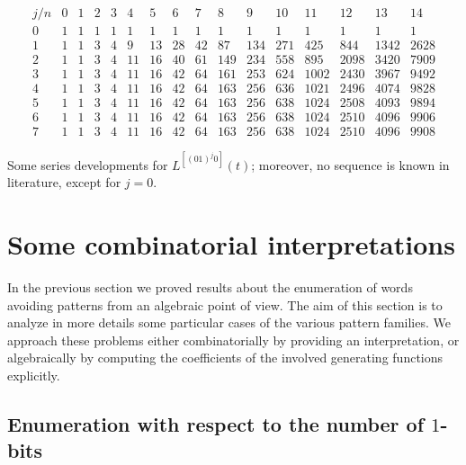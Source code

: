 \begin{table}
\begin{equation*}\begin{array}{c|ccccccccccccccc}j/n & 0 & 1 & 2 & 3 & 4 & 5 & 6 & 7 & 8 & 9 & 10 & 11 & 12 & 13 & 14\\\hline0 & 1 & 1 & 1 & 1 & 1 & 1 & 1 & 1 & 1 & 1 & 1 & 1 & 1 & 1 & 1\\1 & 1 & 1 & 3 & 4 & 9 & 13 & 28 & 42 & 87 & 134 & 271 & 425 & 844 & 1342 & 2628\\2 & 1 & 1 & 3 & 4 & 11 & 16 & 40 & 61 & 149 & 234 & 558 & 895 & 2098 & 3420 & 7909\\3 & 1 & 1 & 3 & 4 & 11 & 16 & 42 & 64 & 161 & 253 & 624 & 1002 & 2430 & 3967 & 9492\\4 & 1 & 1 & 3 & 4 & 11 & 16 & 42 & 64 & 163 & 256 & 636 & 1021 & 2496 & 4074 & 9828\\5 & 1 & 1 & 3 & 4 & 11 & 16 & 42 & 64 & 163 & 256 & 638 & 1024 & 2508 & 4093 & 9894\\6 & 1 & 1 & 3 & 4 & 11 & 16 & 42 & 64 & 163 & 256 & 638 & 1024 & 2510 & 4096 & 9906\\7 & 1 & 1 & 3 & 4 & 11 & 16 & 42 & 64 & 163 & 256 & 638 & 1024 & 2510 & 4096 & 9908\end{array}\end{equation*}
\caption{Some series developments for $L^{[(01)^{j}0]}(t)$; moreover, no
sequence is known in literature, except for $j=0$.}
\label{tbl:L01_j:0}
\end{table}




\section{Some combinatorial interpretations}

In the previous section we proved results about the enumeration of words
avoiding patterns from an algebraic point of view. The aim of this section is
to analyze in more details some particular cases of the various pattern
families. We approach these problems either combinatorially by providing an interpretation, or algebraically by
computing the coefficients of the involved generating functions explicitly.

\subsection{Enumeration with respect to the number of $1$-bits}

